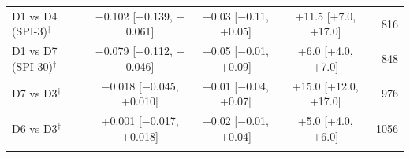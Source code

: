 \begin{table}[tbp]
\begin{tabular*}{\textwidth}{@{\extracolsep\fill}lcccr}
\quad D1 vs D4 (SPI-3)$^{\ddagger}$ & $-$0.102 [$-$0.139, $-$0.061] & $-$0.03 [$-$0.11, +0.05] & +11.5 [+7.0, +17.0] & 816 \\
\quad D1 vs D7 (SPI-30)$^{\dagger}$ & $-$0.079 [$-$0.112, $-$0.046] & +0.05 [$-$0.01, +0.09] & +6.0 [+4.0, +7.0] & 848 \\
\quad D7 vs D3$^{\dagger}$ & $-$0.018 [$-$0.045, +0.010] & +0.01 [$-$0.04, +0.07] & +15.0 [+12.0, +17.0] & 976 \\
\quad D6 vs D3$^{\dagger}$ & +0.001 [$-$0.017, +0.018] & +0.02 [$-$0.01, +0.04] & +5.0 [+4.0, +6.0] & 1056 \\
\botrule
\end{tabular*}
\end{table}
